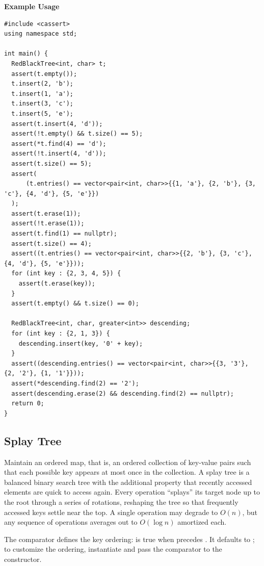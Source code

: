 \textbf{Example Usage}\par
\begin{lstlisting}[style=cpp]
#include <cassert>
using namespace std;

int main() {
  RedBlackTree<int, char> t;
  assert(t.empty());
  t.insert(2, 'b');
  t.insert(1, 'a');
  t.insert(3, 'c');
  t.insert(5, 'e');
  assert(t.insert(4, 'd'));
  assert(!t.empty() && t.size() == 5);
  assert(*t.find(4) == 'd');
  assert(!t.insert(4, 'd'));
  assert(t.size() == 5);
  assert(
      (t.entries() == vector<pair<int, char>>{{1, 'a'}, {2, 'b'}, {3, 'c'}, {4, 'd'}, {5, 'e'}})
  );
  assert(t.erase(1));
  assert(!t.erase(1));
  assert(t.find(1) == nullptr);
  assert(t.size() == 4);
  assert((t.entries() == vector<pair<int, char>>{{2, 'b'}, {3, 'c'}, {4, 'd'}, {5, 'e'}}));
  for (int key : {2, 3, 4, 5}) {
    assert(t.erase(key));
  }
  assert(t.empty() && t.size() == 0);

  RedBlackTree<int, char, greater<int>> descending;
  for (int key : {2, 1, 3}) {
    descending.insert(key, '0' + key);
  }
  assert((descending.entries() == vector<pair<int, char>>{{3, '3'}, {2, '2'}, {1, '1'}}));
  assert(*descending.find(2) == '2');
  assert(descending.erase(2) && descending.find(2) == nullptr);
  return 0;
}
\end{lstlisting}
\subsection{Splay Tree}
\label{sec:2.4.4}
Maintain an ordered map, that is, an ordered collection of key-value pairs such that each possible key appears at most once in the collection. A splay tree is a balanced binary search tree with the additional property that recently accessed elements are quick to access again. Every operation ``splays'' its target node up to the root through a series of rotations, reshaping the tree so that frequently accessed keys settle near the top. A single operation may degrade to $O(n)$, but any sequence of operations averages out to $O(\log n)$ amortized each.

The comparator  defines the key ordering:  is true when  precedes . It defaults to ; to customize the ordering, instantiate  and pass the comparator to the constructor.

